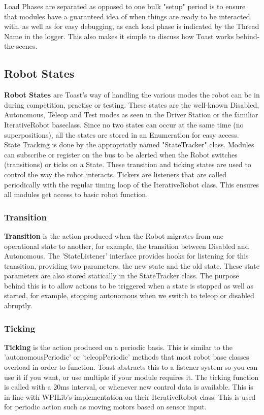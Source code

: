 \documentclass[a4paper,12pt]{article}
\begin{document}
Load Phases are separated as opposed to one bulk "setup" period is to ensure that modules have a guaranteed idea of when things are ready to be interacted with, as well as for easy debugging, as each load phase is indicated by the Thread Name in the logger. This also makes it simple to discuss how Toast works behind-the-scenes.

\subsection{Robot States}
\textbf{Robot States} are Toast's way of handling the various modes the robot can be in during competition, practise or testing. These states are the well-known Disabled, Autonomous, Teleop and Test modes as seen in the Driver Station or the familiar IterativeRobot baseclass. Since no two states can occur at the same time (no superpositions), all the states are stored in an Enumeration for easy access.\\

State Tracking is done by the appropriatly named "StateTracker" class. Modules can subscribe or register on the bus to be alerted when the Robot switches (transitions) or ticks on a State. These transition and ticking states are used to control the way the robot interacts. Tickers are listeners that are called periodically with the regular timing loop of the IterativeRobot class. This ensures all modules get access to basic robot function.

\subsubsection{Transition}
\textbf{Transition} is the action produced when the Robot migrates from one operational state to another, for example, the transition between Disabled and Autonomous. The 'StateListener' interface provides hooks for listening for this transition, providing two parameters, the new state and the old state. These state parameters are also stored statically in the StateTracker class. The purpose behind this is to allow actions to be triggered when a state is stopped as well as started, for example, stopping autonomous when we switch to teleop or disabled abruptly.

\subsubsection{Ticking}
\textbf{Ticking} is the action produced on a periodic basis. This is similar to the 'autonomousPeriodic' or 'teleopPeriodic' methods that most robot base classes overload in order to function. Toast abstracts this to a listener system so you can use it if you want, or use multiple if your module requires it. The ticking function is called with a 20ms interval, or whenever new control data is available. This is in-line with WPILib's implementation on their IterativeRobot class. This is used for periodic action such as moving motors based on sensor input.\\
\end{document}
